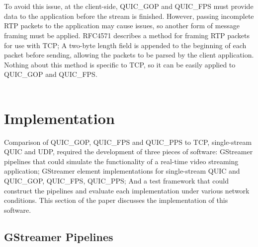 \documentclass{mpaper}
\begin{document}
\\\\
To avoid this issue, at the client-side, QUIC\_GOP and \newline QUIC\_FPS must provide data to the application before the stream is finished. However, passing incomplete RTP packets to the application may cause issues, so another form of message framing must be applied. RFC4571\cite{RFC4571} describes a method for framing RTP packets for use with TCP; A two-byte length field is appended to the beginning of each packet before sending, allowing the packets to be parsed by the client application. Nothing about this method is specific to TCP, so it can be easily applied to QUIC\_GOP and QUIC\_FPS.
\\\\
\section{Implementation} \label{Implementation}

Comparison of QUIC\_GOP, QUIC\_FPS and QUIC\_PPS to TCP, single-stream QUIC and UDP, required the development of three pieces of software: GStreamer pipelines that could simulate the functionality of a real-time video streaming application; GStreamer element implementations for single-stream QUIC and QUIC\_GOP, QUIC\_FPS, \newline QUIC\_PPS; And a test framework that could construct the pipelines and evaluate each implementation under various network conditions. This section of the paper discusses the implementation of this software.

\subsection{GStreamer Pipelines} \label{GStreamer Pipelines}
\end{document}

